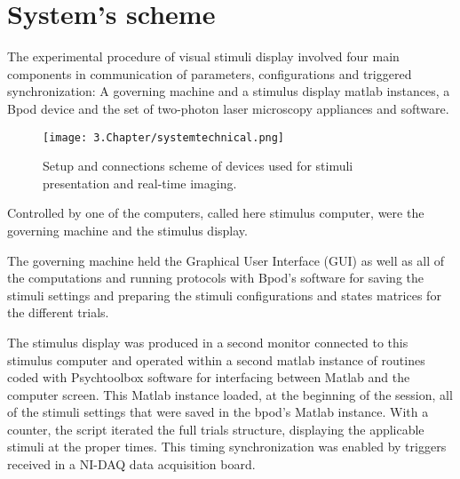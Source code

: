 \section{System's scheme}
\label{sec:sectiona}

The experimental procedure of visual stimuli display involved four main components in communication of parameters, configurations and triggered synchronization: A governing machine and a stimulus display matlab instances, a Bpod device and the set of two-photon laser microscopy appliances and software. 

\begin{figure}[H]
	\centering
		\texttt{[image: 3.Chapter/systemtechnical.png]}
	\caption[c1]{Setup and connections scheme of devices used for stimuli presentation and real-time imaging.}
	\label{fig:systemtechnical}
\end{figure}

Controlled by one of the computers, called here stimulus computer, were the governing machine and the stimulus display.

The governing machine held the Graphical User Interface (GUI) as well as all of the computations and running protocols with Bpod's software for saving the stimuli settings and preparing the stimuli configurations and states matrices for the different trials. 

The stimulus display was produced in a second monitor connected to this stimulus computer and operated within a second matlab instance of routines coded with Psychtoolbox software for interfacing between Matlab and the computer screen. This Matlab instance loaded, at the beginning of the session, all of the stimuli settings that were saved in the bpod's Matlab instance. With a counter, the script iterated the full trials structure, displaying the applicable stimuli at the proper times. This timing synchronization was enabled by triggers received in a NI-DAQ data acquisition board. 

